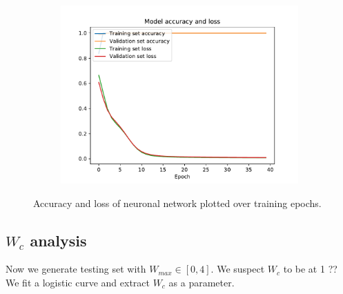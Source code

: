 \documentclass[reprint,amsmath,amssymb,aps,prb]{revtex4-2}
\begin{document}
\begin{figure}[H]
\begin{subfigure}[c]{0.3\textwidth}
		\includegraphics[width=\textwidth]{../results/N12_accuracy_loss_epochs}
		\label{fig:N12_loss_epochs}
	\end{subfigure}
	\caption{Accuracy and loss of neuronal network plotted over training epochs.}
\end{figure}



\subsection{$W_c$ analysis}


Now we generate testing set with $W_{max} \in \left[0,4\right]$. We suspect $W_c$ to be at 1 ??%
We fit a logistic curve and extract $W_c$ as a parameter.
\end{document}
